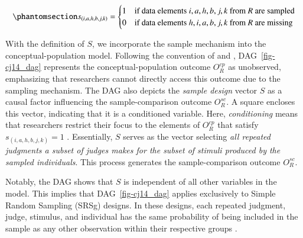 \documentclass[
  authoryear,
  review,
  1p]{elsarticle}
\begin{document}
\begin{equation}\phantomsection\label{eq-mat26}{
s_{(i,a,h,b,j,k)} = \begin{cases} 
1 & \text{if data elements } i,a,h,b,j,k \text{ from } R \text{ are sampled} \\
0 & \text{if data elements } h,i,a,b,j,k \text{ from } R \text{ are missing}
\end{cases}
}\end{equation}

With the definition of \(S\), we incorporate the sample mechanism into
the conceptual-population model. Following the convention of
\citet{McElreath_2020} and \citet{Deffner_et_al_2022},
DAG~\ref{fig-cj14_dag} represents the conceptual-population outcome
\(O^{cp}_{R}\) as unobserved, emphasizing that researchers cannot
directly access this outcome due to the sampling mechanism. The DAG also
depicts the \emph{sample design} vector \(S\) as a causal factor
influencing the sample-comparison outcome \(O^{sc}_{R}\). A square
encloses this vector, indicating that it is a conditioned variable.
Here, \emph{conditioning} means that researchers restrict their focus to
the elements of \(O^{cp}_{R}\) that satisfy \(s_{(i,a,h,b,j,k)}=1\)
\citep{Neal_2020, McElreath_2020}. Essentially, \(S\) serves as the
vector selecting \emph{all repeated judgments a subset of judges makes
for the subset of stimuli produced by the sampled individuals}. This
process generates the sample-comparison outcome \(O^{sc}_{R}\).

Notably, the DAG shows that \(S\) is independent of all other variables
in the model. This implies that DAG~\ref{fig-cj14_dag} applies
exclusively to Simple Random Sampling (SRSg) designs. In these designs,
each repeated judgment, judge, stimulus, and individual has the same
probability of being included in the sample as any other observation
within their respective groups \citep{Lawson_2015}.
\end{document}
